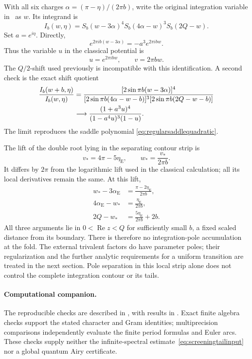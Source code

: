 With all six charges $\alpha=(\pi-\eta)/(2\pi b)$, write the
original integration variable in~\cite[eq.~(2.27)]{TeschnerVartanov}
as $w$. Its integrand is
\begin{equation}
 I_b(w,\eta)=S_b(w-3\alpha)^4
             S_b(4\alpha-w)^3S_b(2Q-w).
 \label{eq:regularquantumintegrand}
\end{equation}
Set $a=e^{i\eta}$. Directly,
\[
 e^{2\pi ib(w-3\alpha)}=-a^3e^{2\pi ibw}.
\]
Thus the variable $u$ in the classical potential is
\begin{equation}
 u=e^{2\pi ibw},\qquad v=2\pi bw.
 \label{eq:correctquantumcoordinate}
\end{equation}
The $Q/2$-shift used previously is incompatible with this
identification. A second check is the exact shift quotient
\begin{align}
 \frac{I_b(w+b,\eta)}{I_b(w,\eta)}
 &=
 \frac{[2\sin\pi b(w-3\alpha)]^4}
 {[2\sin\pi b(4\alpha-w-b)]^3
  [2\sin\pi b(2Q-w-b)]}\notag\\
 &\longrightarrow
 \frac{(1+a^3u)^4}{(1-a^4u)^3(1-u)}.
 \label{eq:exactintegrandquotient}
\end{align}
The limit reproduces the saddle polynomial
\eqref{eq:regularsaddlequadratic}.

The lift of the double root lying in the separating contour strip is
\[
 v_*=4\pi-5\eta_{\mathrm E},\qquad
 w_*=\frac{v_*}{2\pi b}.
\]
It differs by $2\pi$ from the logarithmic lift used in the classical
calculation; all its local derivatives remain the same. At this lift,
\begin{equation}
 \begin{aligned}
 w_*-3\alpha_{\mathrm E}
       &=\frac{\pi-2\eta_{\mathrm E}}{2\pi b},\\
 4\alpha_{\mathrm E}-w_*&=\frac{\eta_{\mathrm E}}{2\pi b},\\
 2Q-w_*&=\frac{5\eta_{\mathrm E}}{2\pi b}+2b.
 \end{aligned}
 \label{eq:correctfoldarguments}
\end{equation}
All three arguments lie in $0<\operatorname{Re}z<Q$ for
sufficiently small $b$, a fixed scaled distance from its boundary.
There is therefore no integration-pole accumulation at the fold.
The external trivalent factors do have parameter poles; their
regularization and the further analytic requirements for a uniform
transition are treated in the next section. Pole separation in
this local strip alone does not control the complete integration
contour or its tails.

\paragraph{Computational companion.}
The reproducible checks are described in
, with results in
. Exact finite algebra
checks support the stated character and Gram identities;
multiprecision comparisons independently evaluate the finite
period formulas and Euler arcs. These checks supply neither
the infinite-spectral estimate~\eqref{eq:screeningtailinput}
nor a global quantum Airy certificate.

